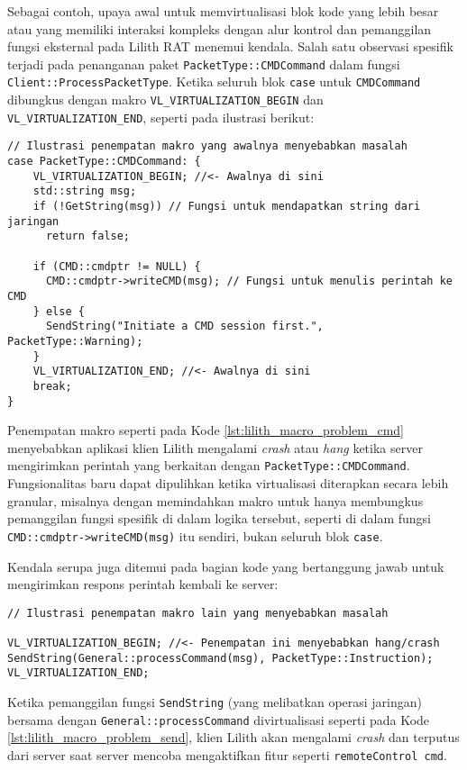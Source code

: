 Sebagai contoh, upaya awal untuk memvirtualisasi blok kode yang lebih besar atau yang memiliki interaksi kompleks dengan alur kontrol dan pemanggilan fungsi eksternal pada Lilith RAT menemui kendala. Salah satu observasi spesifik terjadi pada penanganan paket \texttt{PacketType::CMDCommand} dalam fungsi \texttt{Client::ProcessPacketType}. Ketika seluruh blok \texttt{case} untuk \texttt{CMDCommand} dibungkus dengan makro \texttt{VL\_VIRTUALIZATION\_BEGIN} dan \texttt{VL\_VIRTUALIZATION\_END}, seperti pada ilustrasi berikut:

\begin{listing}[H]
\begin{verbatim}
// Ilustrasi penempatan makro yang awalnya menyebabkan masalah
case PacketType::CMDCommand: {
    VL_VIRTUALIZATION_BEGIN; //<- Awalnya di sini
    std::string msg;
    if (!GetString(msg)) // Fungsi untuk mendapatkan string dari jaringan
      return false;

    if (CMD::cmdptr != NULL) {
      CMD::cmdptr->writeCMD(msg); // Fungsi untuk menulis perintah ke CMD
    } else {
      SendString("Initiate a CMD session first.", PacketType::Warning);
    }
    VL_VIRTUALIZATION_END; //<- Awalnya di sini
    break;
}
\end{verbatim}
\label{lst:lilith_macro_problem_cmd}
\end{listing}

Penempatan makro seperti pada Kode \ref{lst:lilith_macro_problem_cmd} menyebabkan aplikasi klien Lilith mengalami \textit{crash} atau \textit{hang} ketika server mengirimkan perintah yang berkaitan dengan \texttt{PacketType::CMDCommand}. Fungsionalitas baru dapat dipulihkan ketika virtualisasi diterapkan secara lebih granular, misalnya dengan memindahkan makro untuk hanya membungkus pemanggilan fungsi spesifik di dalam logika tersebut, seperti di dalam fungsi \texttt{CMD::cmdptr->writeCMD(msg)} itu sendiri, bukan seluruh blok \texttt{case}.

Kendala serupa juga ditemui pada bagian kode yang bertanggung jawab untuk mengirimkan respons perintah kembali ke server:
\begin{listing}[H]
\begin{verbatim}
// Ilustrasi penempatan makro lain yang menyebabkan masalah
 
VL_VIRTUALIZATION_BEGIN; //<- Penempatan ini menyebabkan hang/crash
SendString(General::processCommand(msg), PacketType::Instruction);
VL_VIRTUALIZATION_END;

\end{verbatim}
\label{lst:lilith_macro_problem_send}
\end{listing}
Ketika pemanggilan fungsi \texttt{SendString} (yang melibatkan operasi jaringan) bersama dengan \texttt{General::processCommand} divirtualisasi seperti pada Kode \ref{lst:lilith_macro_problem_send}, klien Lilith akan mengalami \textit{crash} dan terputus dari server saat server mencoba mengaktifkan fitur seperti \texttt{remoteControl cmd}.

